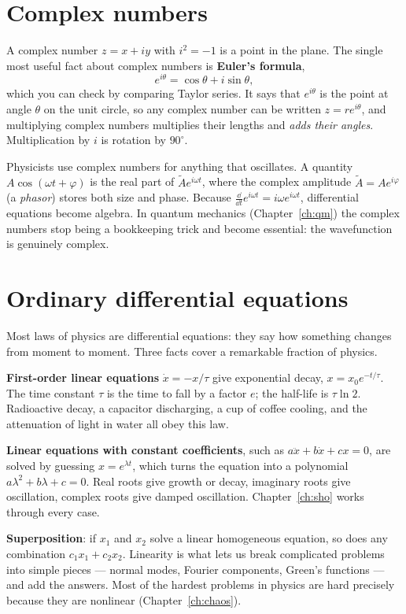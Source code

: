 \section{Complex numbers}

A complex number $z = x+iy$ with $i^2=-1$ is a point in the plane. The single most useful fact about complex numbers is \textbf{Euler's formula},
\[
  e^{i\theta} = \cos\theta + i\sin\theta ,
\]
which you can check by comparing Taylor series. It says that $e^{i\theta}$ is the point at angle $\theta$ on the unit circle, so any complex number can be written $z = re^{i\theta}$, and multiplying complex numbers multiplies their lengths and \emph{adds their angles}. Multiplication by $i$ is rotation by $90^\circ$.

Physicists use complex numbers for anything that oscillates. A quantity $A\cos(\omega t+\varphi)$ is the real part of $\tilde A e^{i\omega t}$, where the complex amplitude $\tilde A = Ae^{i\varphi}$ (a \emph{phasor}) stores both size and phase. Because $\tfrac{\dd}{\dd t}e^{i\omega t} = i\omega e^{i\omega t}$, differential equations become algebra. In quantum mechanics (Chapter~\ref{ch:qm}) the complex numbers stop being a bookkeeping trick and become essential: the wavefunction is genuinely complex.

\section{Ordinary differential equations}

Most laws of physics are differential equations: they say how something changes from moment to moment. Three facts cover a remarkable fraction of physics.

\textbf{First-order linear equations} $\dot x = -x/\tau$ give exponential decay, $x = x_0 e^{-t/\tau}$. The time constant $\tau$ is the time to fall by a factor $e$; the half-life is $\tau\ln 2$. Radioactive decay, a capacitor discharging, a cup of coffee cooling, and the attenuation of light in water all obey this law.

\textbf{Linear equations with constant coefficients}, such as $a\ddot x + b\dot x + cx = 0$, are solved by guessing $x = e^{\lambda t}$, which turns the equation into a polynomial $a\lambda^{2}+b\lambda+c=0$. Real roots give growth or decay, imaginary roots give oscillation, complex roots give damped oscillation. Chapter~\ref{ch:sho} works through every case.

\textbf{Superposition}: if $x_1$ and $x_2$ solve a linear homogeneous equation, so does any combination $c_1x_1 + c_2x_2$. Linearity is what lets us break complicated problems into simple pieces --- normal modes, Fourier components, Green's functions --- and add the answers. Most of the hardest problems in physics are hard precisely because they are nonlinear (Chapter~\ref{ch:chaos}).

